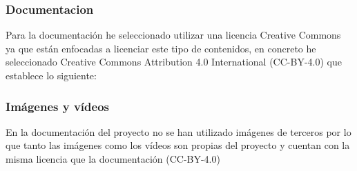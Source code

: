 \subsubsection{Documentacion}

Para la documentación he seleccionado utilizar una licencia Creative Commons ya que están enfocadas a licenciar este tipo de contenidos, en concreto he seleccionado Creative Commons Attribution 4.0 International (CC-BY-4.0) que establece lo siguiente:

\subsubsection{Imágenes y vídeos}

En la documentación del proyecto no se han utilizado imágenes de terceros por lo que tanto las imágenes como los vídeos son propias del proyecto y cuentan con la misma licencia que la documentación (CC-BY-4.0)




